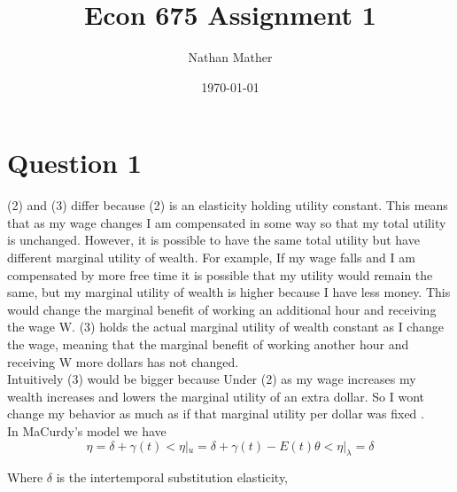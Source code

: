\documentclass[11pt]{article}
\title{Econ 675 Assignment 1} %
\author{Nathan Mather} %
\date{\today} %
\begin{document}
	
\maketitle %

\setcounter{tocdepth}{2} %

\tableofcontents %



\section{Question 1}

(2) and (3) differ because (2) is an elasticity holding utility constant. This means that as my wage changes I am compensated in some way so that my total utility is unchanged. However, it is possible to have the same total utility but have different marginal utility of wealth. For example, If my wage falls and I am compensated by more free time it is possible that my utility would remain the same, but my marginal utility of wealth is higher because I have less money. This would change the marginal benefit of working an additional hour and receiving the wage W. (3) holds the actual marginal utility of wealth constant as I change the wage, meaning that the marginal benefit of working another hour and receiving W more dollars has not changed. \\

Intuitively (3) would be bigger because Under (2) as my wage increases my wealth increases and lowers the marginal utility of an extra dollar. So I wont change my behavior as much as if that marginal utility per dollar was fixed . \\

In MaCurdy's model we have 
$$ \eta = \delta+\gamma(t) < \eta |_u = \delta + \gamma(t) -E(t) \theta < \eta|_{\lambda} = \delta
$$

Where $\delta$ is the intertemporal substitution elasticity, 



\end{document}
